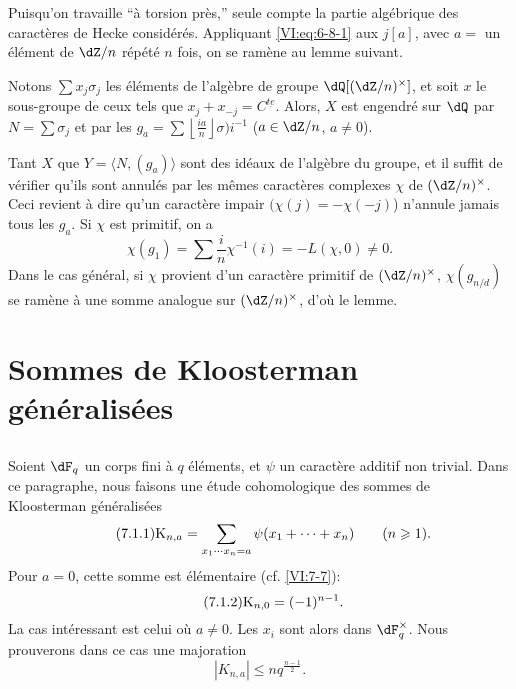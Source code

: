 Puisqu'on travaille ``à torsion près,'' seule compte la partie algébrique 
des caractères de Hecke considérés. Appliquant \eqref{VI:eq:6-8-1} aux 
$j[a]$, avec $a=$ un élément de $\dZ/n$ répété $n$ fois, on se 
ramène au lemme suivant.





\begin{lemma_}\label{VI:6-12}
Notons $\sum x_j \sigma_j$ les éléments de l'algèbre de groupe 
$\dQ[(\dZ/n)^\times]$, et soit $x$ le sous-groupe de ceux tels que 
$x_j+x_{-j}=C^{\underline{t e}}$. Alors, $X$ est engendré sur $\dQ$ par 
$N=\sum \sigma_j$ et par les 
$g_a=\sum \left\lfloor \frac{i a}{n}\right\rfloor \sigma)i^{-1}$ 
($a\in \dZ/n$, $a\ne 0$). 
\end{lemma_}

Tant $X$ que $Y=\langle N,(g_a)\rangle$ sont des idéaux de l'algèbre du 
groupe, et il suffit de vérifier qu'ils sont annulés par les mêmes 
caractères complexes $\chi$ de $(\dZ/n)^\times$. Ceci revient à dire qu'un 
caractère impair $(\chi(j)=-\chi(-j)$) n'annule jamais tous les $g_a$. Si 
$\chi$ est primitif, on a 
\[
  \chi(g_1) = \sum \frac i n \chi^{-1}(i) = -L(\chi,0)\ne 0 \text{.} 
\]
Dans le cas général, si $\chi$ provient d'un caractère primitif de 
$(\dZ/n)^\times$, $\chi(g_{n/d})$ se ramène à une somme analogue sur 
$(\dZ/n)^\times$, d'où le lemme. 










\section{Sommes de Kloosterman généralisées}\label{VI:7}





\subsection{}\label{VI:7-1}

Soient $\dF_q$ un corps fini à $q$ éléments, et $\psi$ un caractère 
additif non trivial. Dans ce paragraphe, nous faisons une étude cohomologique 
des sommes de Kloosterman généralisées 
\begin{equation*}\tag{7.1.1}\label{VI;eq:7-1-1}
  \textnormal{K}_{n,a} = \sum_{x_1\dotsm x_n = a} \psi(x_1+\cdots + x_n) \qquad (n\geqslant 1) \text{.} 
\end{equation*}
Pour $a=0$, cette somme est élémentaire (cf. \ref{VI:7-7}): 
\begin{equation*}\tag{7.1.2}\label{VI:eq:7-1-2}
  \textnormal{K}_{n,0} = (-1)^{n-1} \text{.} 
\end{equation*}
La cas intéressant est celui où $a\ne 0$. Les $x_i$ sont alors dans 
$\dF_q^\times$. Nous prouverons dans ce cas une majoration 
\begin{equation*}\tag{7.1.3}\label{VI:eq:7-1-3}
  \left|K_{n,a}\right| \leqslant n q^{\frac{n-1}{2}} \text{.} 
\end{equation*}

